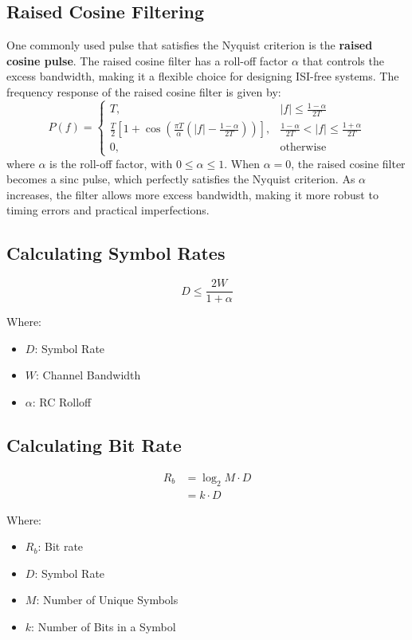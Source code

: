 \documentclass[10pt]{article}
\begin{document}
\subsection{Raised Cosine Filtering}
One commonly used pulse that satisfies the Nyquist criterion is the \textbf{raised cosine pulse}. The raised cosine filter has a roll-off factor \( \alpha \) that controls the excess bandwidth, making it a flexible choice for designing ISI-free systems. The frequency response of the raised cosine filter is given by:
\[
P(f) =
\begin{cases}
T, & |f| \le \frac{1 - \alpha}{2T} \\
\frac{T}{2} \left[ 1 + \cos\left( \frac{\pi T}{\alpha} \left( |f| - \frac{1 - \alpha}{2T} \right) \right) \right], & \frac{1 - \alpha}{2T} < |f| \le \frac{1 + \alpha}{2T} \\
0, & \text{otherwise}
\end{cases}
\]
where \( \alpha \) is the roll-off factor, with \( 0 \leq \alpha \leq 1 \). When \( \alpha = 0 \), the raised cosine filter becomes a sinc pulse, which perfectly satisfies the Nyquist criterion. As \( \alpha \) increases, the filter allows more excess bandwidth, making it more robust to timing errors and practical imperfections.

\subsection{Calculating Symbol Rates}
\[
    D \le \frac{2W}{1 + \alpha}
\]

\noindent Where:
\begin{itemize}
    \item $D$: Symbol Rate
    \item $W$: Channel Bandwidth
    \item $\alpha$: RC Rolloff
\end{itemize}

\subsection{Calculating Bit Rate}
\begin{align*}
    R_b &= \log_2{M} \cdot D \\ 
        &= k \cdot D
\end{align*}

\noindent Where:
\begin{itemize}
    \item $R_b$: Bit rate
    \item $D$: Symbol Rate
    \item $M$: Number of Unique Symbols
    \item $k$: Number of Bits in a Symbol
\end{itemize}
\end{document}
